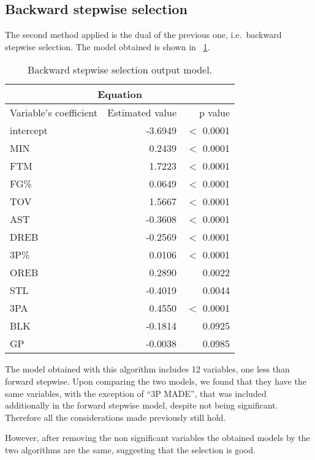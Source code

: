 \subsection{Backward stepwise selection}

The second method applied is the dual of the previous one, i.e.\ backward stepwise selection. The model obtained is shown in \Tab~\ref{table:BackwardModelSummary}.

\begin{table}[H]
	\centering
	\begin{tabular}{|| l | r | r ||} 
		\hline
		\multicolumn{3}{|c|}{Equation} \\
		\hline
		Variable's coefficient & Estimated value & p value \\
		\hline
		intercept & -3.6949 & $<$ 0.0001 \\
		MIN & 0.2439 & $<$ 0.0001 \\
		FTM & 1.7223 & $<$ 0.0001 \\
		FG\% & 0.0649 & $<$ 0.0001 \\
		TOV & 1.5667 & $<$ 0.0001 \\
		AST & -0.3608 & $<$ 0.0001 \\
		DREB & -0.2569 & $<$ 0.0001 \\
		3P\% & 0.0106 & $<$ 0.0001 \\
		OREB & 0.2890 & 0.0022 \\
		STL & -0.4019 & 0.0044 \\
		3PA & 0.4550 & $<$ 0.0001 \\
		BLK & -0.1814 & 0.0925 \\
		GP & -0.0038 & 0.0985 \\
		\hline
	\end{tabular}
	\caption{Backward stepwise selection output model.}
	\label{table:BackwardModelSummary}
\end{table}

The model obtained with this algorithm includes 12 variables, one less than forward stepwise. Upon comparing the two models, we found that they have the same variables, with the exception of ``3P MADE'', that was included additionally in the forward stepwise model, despite not being significant.
Therefore all the considerations made previously still hold.

However, after removing the non significant variables the obtained models by the two algorithms are the same, suggesting that the selection is good.